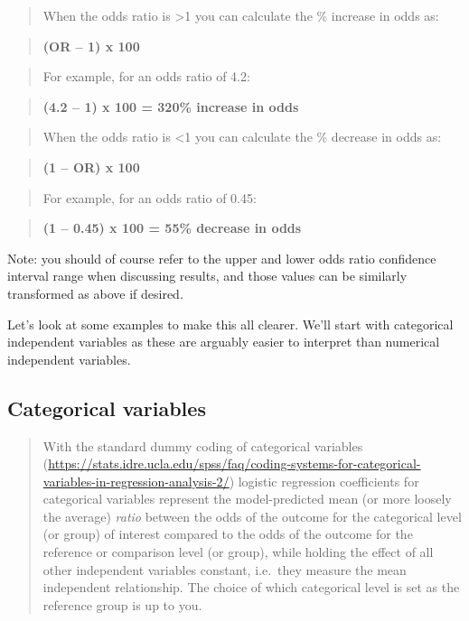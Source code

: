 \documentclass[
]{book}
\begin{document}
\begin{quote}
When the odds ratio is \textgreater1 you can calculate the \% increase in odds as:
\end{quote}

\begin{quote}
\textbf{(OR -- 1) x 100}
\end{quote}

\begin{quote}
For example, for an odds ratio of 4.2:
\end{quote}

\begin{quote}
\textbf{(4.2 -- 1) x 100 = 320\% increase in odds}
\end{quote}

\begin{quote}
When the odds ratio is \textless1 you can calculate the \% decrease in odds as:
\end{quote}

\begin{quote}
\textbf{(1 -- OR) x 100}
\end{quote}

\begin{quote}
For example, for an odds ratio of 0.45:
\end{quote}

\begin{quote}
\textbf{(1 -- 0.45) x 100 = 55\% decrease in odds}
\end{quote}

Note: you should of course refer to the upper and lower odds ratio confidence interval range when discussing results, and those values can be similarly transformed as above if desired.

Let's look at some examples to make this all clearer. We'll start with categorical independent variables as these are arguably easier to interpret than numerical independent variables.

\hypertarget{categorical-variables-2}{%
\subsection{Categorical variables}\label{categorical-variables-2}}

\begin{quote}
With the standard dummy coding of categorical variables (\url{https://stats.idre.ucla.edu/spss/faq/coding-systems-for-categorical-variables-in-regression-analysis-2/}) logistic regression coefficients for categorical variables represent the model-predicted mean (or more loosely the average) \emph{ratio} between the odds of the outcome for the categorical level (or group) of interest compared to the odds of the outcome for the reference or comparison level (or group), while holding the effect of all other independent variables constant, i.e.~they measure the mean independent relationship. The choice of which categorical level is set as the reference group is up to you.
\end{quote}
\end{document}
